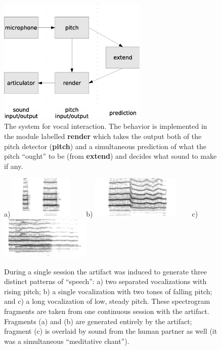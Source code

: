 
\begin{figure}[bt]
\centerline{\includegraphics[height=6cm]{images/sing-modules}}
\caption {
%
\label{fig:sing-module}
%
The system for vocal interaction.
The behavior is implemented in the module labelled {\bf render} which
takes the output both of the pitch detector ({\bf pitch}) and a simultaneous 
prediction of what the pitch ``ought'' to be (from {\bf extend})
and decides what sound to make if any.
%
}
\end{figure}


\begin{figure}[bt]

\centerline{
a)
\includegraphics[height=2cm]{images/chico-output-separate-high-low}
\ \ 
\ \ 
b)
\includegraphics[height=2cm]{images/chico-output-pair-high-low}
\ \ 
\ \ 
c)
\includegraphics[height=2cm]{images/chico-output-ohm}
}

\caption{
%
\label{fig:singing-outcome}
%
During a single session the artifact was induced
to generate three distinct patterns of ``speech'': a) two separated
vocalizations with rising pitch; b) a single vocalization with
two tones of falling pitch; and c) a long vocalization of low, steady
pitch.
%
These spectrogram fragments are taken from one continuous session
with the artifact.  Fragments (a) and (b) are generated entirely
by the artifact; fragment (c) is overlaid by sound from
the human partner as well (it was a simultaneous ``meditative chant'').
%
}

\end{figure}





